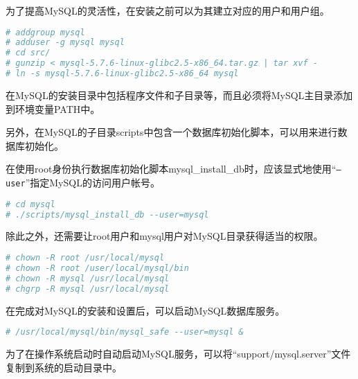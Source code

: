 为了提高MySQL的灵活性，在安装之前可以为其建立对应的用户和用户组。



\begin{lstlisting}[language=bash]
# addgroup mysql
# adduser -g mysql mysql
# cd src/
# gunzip < mysql-5.7.6-linux-glibc2.5-x86_64.tar.gz | tar xvf -
# ln -s mysql-5.7.6-linux-glibc2.5-x86_64 mysql
\end{lstlisting}

在MySQL的安装目录中包括程序文件和子目录等，而且必须将MySQL主目录添加到环境变量PATH中。

另外，在MySQL的子目录scripts中包含一个数据库初始化脚本，可以用来进行数据库初始化。

在使用root身份执行数据库初始化脚本mysql\_install\_db时，应该显式地使用“\texttt{--user}”指定MySQL的访问用户帐号。


\begin{lstlisting}[language=bash]
# cd mysql
# ./scripts/mysql_install_db --user=mysql
\end{lstlisting}

除此之外，还需要让root用户和mysql用户对MySQL目录获得适当的权限。

\begin{lstlisting}[language=bash]
# chown -R root /usr/local/mysql
# chown -R root /user/local/mysql/bin
# chown -R mysql /usr/local/mysql
# chgrp -R mysql /usr/local/mysql
\end{lstlisting}

在完成对MySQL的安装和设置后，可以启动MySQL数据库服务。

\begin{lstlisting}[language=bash]
# /usr/local/mysql/bin/mysql_safe --user=mysql &
\end{lstlisting}

为了在操作系统启动时自动启动MySQL服务，可以将“support/mysql.server”文件复制到系统的启动目录中。

\begin{lstlisting}[language=bash]

\end{lstlisting}




\begin{lstlisting}[language=bash]

\end{lstlisting}




\begin{lstlisting}[language=bash]

\end{lstlisting}




